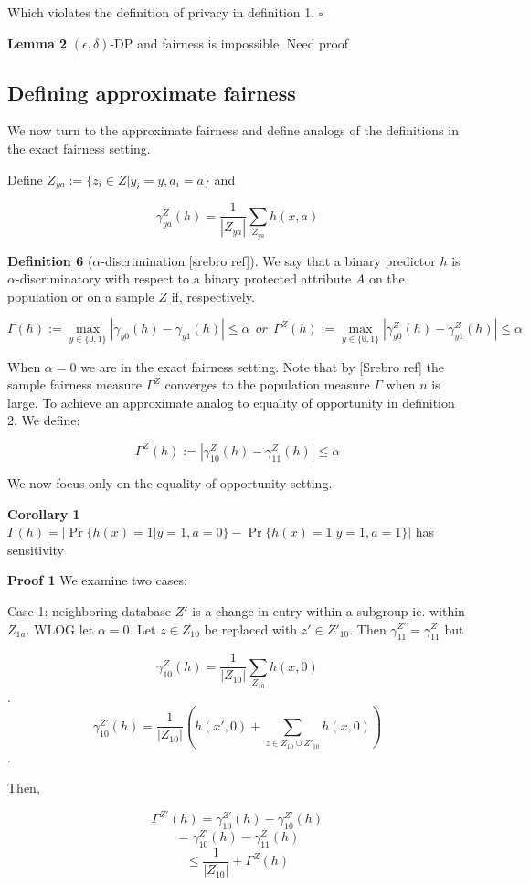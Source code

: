 \documentclass[runningheads]{article}
\newcommand{\1}{\mathbbm{1}}
\theoremstyle{definition}
\begin{document}
Which violates the definition of privacy in definition 1. $\square$
\vspace{0.5cm}

{\bf Lemma 2} $(\epsilon, \delta)$-DP and fairness is impossible. Need proof


\subsection{Defining approximate fairness}
We now turn to the approximate fairness and define analogs of the definitions in the exact fairness setting.

Define $Z_{ya} := \{z_i \in Z | y_i = y, a_i = a \}$ and

$$\gamma_{ya}^Z(h) = \frac{1}{|Z_{ya}|} \sum_{Z_{ya}} h(x,a)$$


{\bf Definition 6} ($\alpha$-discrimination [srebro ref]). We say that a binary predictor $h$ is $\alpha$-discriminatory with respect to a binary protected attribute $A$ on the population or on a sample $Z$ if, respectively.

$$\Gamma(h) := \max_{y\in \{0,1\}}|\gamma_{y0}(h) - \gamma_{y1}(h)| \leq \alpha ~~ or ~~ \Gamma^Z(h) := \max_{y\in \{0,1\}}|\gamma_{y0}^Z(h) - \gamma_{y1}^Z(h)| \leq \alpha$$


When $\alpha = 0$ we are in the exact fairness setting. Note that by [Srebro ref] the sample fairness measure $\Gamma^Z$ converges to the population measure $\Gamma$ when $n$ is large. To achieve an approximate analog to equality of opportunity in definition 2. We define:

$$\Gamma^Z(h) := |\gamma_{10}^Z(h) - \gamma_{11}^Z(h)| \leq \alpha$$

We now focus only on the equality of opportunity setting.

{\bf Corollary 1} $\Gamma(h) = |\Pr\{h(x) = 1 | y=1, a =0\} - \Pr\{h(x) = 1 | y = 1, a = 1\}|$ has sensitivity

{\bf Proof 1}
We examine two cases:

Case 1: neighboring database $Z'$ is a change in entry within a subgroup ie. within $Z_{1a}$. WLOG let $\alpha = 0$. Let $z \in Z_{10}$ be replaced with $z' \in Z'_{10}$. Then $\gamma^{Z'}_{11} = \gamma^Z_{11}$ but

$$\gamma_{10}^Z(h) = \frac{1}{|Z_{10}|} \sum_{Z_{10}} h(x,0)$$.
$$\gamma_{10}^{Z'}(h) = \frac{1}{|Z_{10}|} (h(x', 0) +\sum_{z \in Z_{10} \cup Z'_{10}} h(x, 0))$$.

Then,

$$ \Gamma^{Z'}(h) = \gamma_{10}^{Z'}(h) - \gamma_{10}^{Z'}(h) $$
$$ = \gamma_{10}^{Z'}(h) - \gamma^Z_{11}(h) $$
$$ \leq \frac{1}{|Z_{10}|}  + \Gamma^{Z}(h) $$
\end{document}
